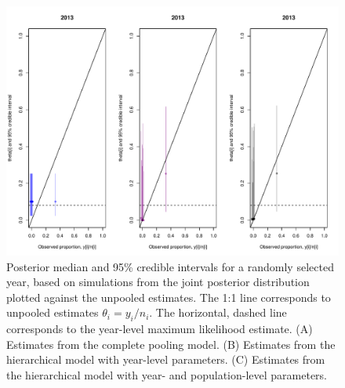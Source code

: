 \documentclass[12pt, oneside, titlepage]{article}   	%
\begin{document}
\begin{figure}[h]
   \centering
       \includegraphics[page=1,width=.9\textwidth]{../figures/appendix-x-figure54-2}  
    \caption{ Posterior median and 95\% credible intervals for a randomly selected year, based on simulations from the joint posterior distribution plotted against the unpooled estimates. The 1:1 line corresponds to unpooled estimates $\theta_i = y_i/n_i$. The horizontal, dashed line corresponds to the year-level maximum likelihood estimate. (A) Estimates from the complete pooling model. (B) Estimates from the hierarchical model with year-level parameters. (C) Estimates from the hierarchical model with year- and population-level parameters. } 
 \label{fig:hierarchical_shrinking1}
\end{figure}
\end{document}
